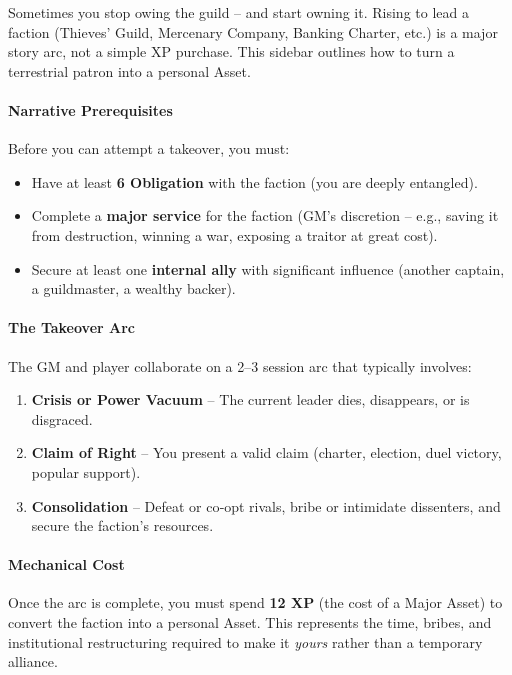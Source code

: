 \begin{tcolorbox}[colback=black!3!white,colframe=black!60!white,title=From Faction to Asset: Taking Over a Terrestrial Patron,label=sec:takeover-sidebar,breakable]
Sometimes you stop owing the guild -- and start owning it. Rising to lead a faction (Thieves' Guild, Mercenary Company, Banking Charter, etc.) is a major story arc, not a simple XP purchase. This sidebar outlines how to turn a terrestrial patron into a personal Asset.

\paragraph{Narrative Prerequisites}
Before you can attempt a takeover, you must:
\begin{itemize}
  \item Have at least \textbf{6 Obligation} with the faction (you are deeply entangled).
  \item Complete a \textbf{major service} for the faction (GM's discretion -- e.g., saving it from destruction, winning a war, exposing a traitor at great cost).
  \item Secure at least one \textbf{internal ally} with significant influence (another captain, a guildmaster, a wealthy backer).
\end{itemize}

\paragraph{The Takeover Arc}
The GM and player collaborate on a 2--3 session arc that typically involves:
\begin{enumerate}
  \item \textbf{Crisis or Power Vacuum} -- The current leader dies, disappears, or is disgraced.
  \item \textbf{Claim of Right} -- You present a valid claim (charter, election, duel victory, popular support).
  \item \textbf{Consolidation} -- Defeat or co‑opt rivals, bribe or intimidate dissenters, and secure the faction's resources.
\end{enumerate}

\paragraph{Mechanical Cost}
Once the arc is complete, you must spend \textbf{12 XP} (the cost of a Major Asset) to convert the faction into a personal Asset. This represents the time, bribes, and institutional restructuring required to make it \emph{yours} rather than a temporary alliance.


\end{tcolorbox}
